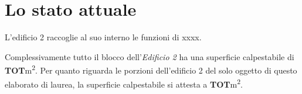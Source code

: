 \chapter{Lo stato attuale}
\thispagestyle{empty}

L'edificio 2 raccoglie al suo interno le funzioni di xxxx.

Complessivamente tutto il blocco dell'\emph{Edificio 2} ha una superficie calpestabile di \textbf{TOT}\si{m^2}. Per quanto riguarda le porzioni dell'edificio 2 del solo oggetto di questo elaborato di laurea, la superficie calpestabile si attesta a \textbf{TOT}\si{m^2}.

